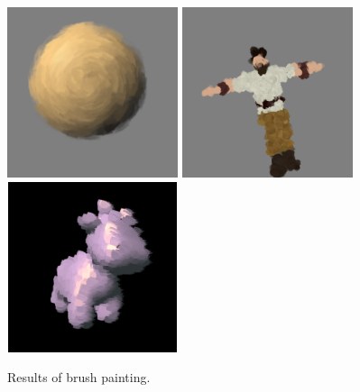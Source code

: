 \begin{figure}
    \begin{center}
    \includegraphics[width=50mm, height=50mm]{Resultats/painting1/final.png}
    \includegraphics[width=50mm, height=50mm]{Resultats/paintChar/final.png}
    \includegraphics[width=50mm, height=50mm]{Resultats/spotPaint.png}
    \end{center}
    \caption{Results of brush painting.}
    \label{results_paint}
\end{figure}


